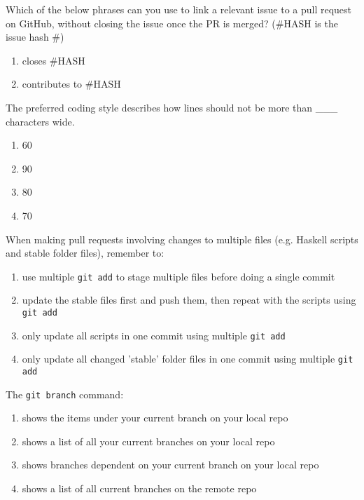 \documentclass[12pt,fleqn]{examtst}
\begin{document}

\newpage
\noindent
\begin{minipage}{\textwidth}

Which of the below phrases can you use to link a relevant issue to a pull request on GitHub, without closing the issue once the PR is merged? (\#HASH is the issue hash \#)

\begin{enumerate}
    \item closes \#HASH
    \item contributes to \#HASH
\end{enumerate}

The preferred coding style describes how lines should not be more than \_\_\_ characters wide.

\begin{enumerate}
    \item 60
    \item 90
    \item 80
    \item 70
\end{enumerate}

When making pull requests involving changes to multiple files (e.g. Haskell scripts and stable folder files), remember to:

\begin{enumerate}
    \item use multiple \lstinline{git add} to stage multiple files before doing a single commit
    \item update the stable files first and push them, then repeat with the scripts using \lstinline{git add}
    \item only update all scripts in one commit using multiple \lstinline{git add}
    \item only update all changed 'stable' folder files in one commit using multiple \lstinline{git add}
\end{enumerate}

The \lstinline{git branch} command:

\begin{enumerate}
    \item shows the items under your current branch on your local repo
    \item shows a list of all your current branches on your local repo
    \item shows branches dependent on your current branch on your local repo
    \item shows a list of all current branches on the remote repo
\end{enumerate}

\end{minipage}
\end{document}
